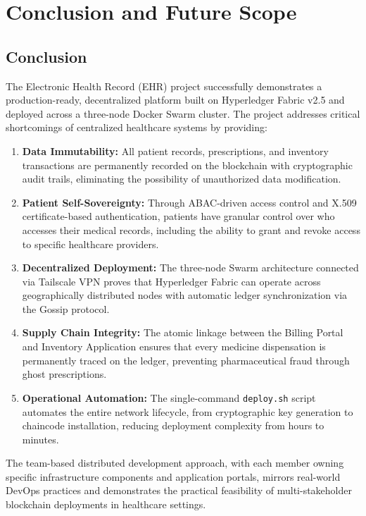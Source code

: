 \chapter{Conclusion and Future Scope}

\section{Conclusion}

The Electronic Health Record (EHR) project successfully demonstrates a production-ready, decentralized platform built on Hyperledger Fabric v2.5 and deployed across a three-node Docker Swarm cluster. The project addresses critical shortcomings of centralized healthcare systems by providing:

\begin{enumerate}
    \item \textbf{Data Immutability:} All patient records, prescriptions, and inventory transactions are permanently recorded on the blockchain with cryptographic audit trails, eliminating the possibility of unauthorized data modification.
    
    \item \textbf{Patient Self-Sovereignty:} Through ABAC-driven access control and X.509 certificate-based authentication, patients have granular control over who accesses their medical records, including the ability to grant and revoke access to specific healthcare providers.
    
    \item \textbf{Decentralized Deployment:} The three-node Swarm architecture connected via Tailscale VPN proves that Hyperledger Fabric can operate across geographically distributed nodes with automatic ledger synchronization via the Gossip protocol.
    
    \item \textbf{Supply Chain Integrity:} The atomic linkage between the Billing Portal and Inventory Application ensures that every medicine dispensation is permanently traced on the ledger, preventing pharmaceutical fraud through ghost prescriptions.
    
    \item \textbf{Operational Automation:} The single-command \texttt{deploy.sh} script automates the entire network lifecycle, from cryptographic key generation to chaincode installation, reducing deployment complexity from hours to minutes.
\end{enumerate}

The team-based distributed development approach, with each member owning specific infrastructure components and application portals, mirrors real-world DevOps practices and demonstrates the practical feasibility of multi-stakeholder blockchain deployments in healthcare settings.

